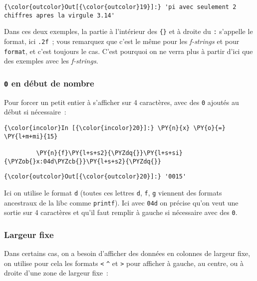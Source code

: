 \begin{Verbatim}[commandchars=\\\{\}]
{\color{outcolor}Out[{\color{outcolor}19}]:} 'pi avec seulement 2 chiffres apres la virgule 3.14'
\end{Verbatim}
            
    Dans ces deux exemples, la partie à l'intérieur des \texttt{\{\}} et à
droite du \texttt{:} s'appelle le format, ici \texttt{.2f}~; vous
remarquez que c'est le même pour les \emph{f-strings} et pour
\texttt{format}, et c'est toujours le cas. C'est pourquoi on ne verra
plus à partir d'ici que des exemples avec les \emph{f-strings}.

    \hypertarget{en-duxe9but-de-nombre}{%
\subsubsection{\texorpdfstring{\texttt{0} en début de
nombre}{0 en début de nombre}}\label{en-duxe9but-de-nombre}}

    Pour forcer un petit entier à s'afficher sur 4 caractères, avec des
\texttt{0} ajoutés au début si nécessaire~:

    \begin{Verbatim}[commandchars=\\\{\}]
{\color{incolor}In [{\color{incolor}20}]:} \PY{n}{x} \PY{o}{=} \PY{l+m+mi}{15}
         
         \PY{n}{f}\PY{l+s+s2}{\PYZdq{}}\PY{l+s+si}{\PYZob{}x:04d\PYZcb{}}\PY{l+s+s2}{\PYZdq{}}
\end{Verbatim}


\begin{Verbatim}[commandchars=\\\{\}]
{\color{outcolor}Out[{\color{outcolor}20}]:} '0015'
\end{Verbatim}
            
    Ici on utilise le format \texttt{d} (toutes ces lettres \texttt{d},
\texttt{f}, \texttt{g} viennent des formats ancestraux de la libc comme
\texttt{printf}). Ici avec \texttt{04d} on précise qu'on veut une sortie
sur 4 caractères et qu'il faut remplir à gauche si nécessaire avec des
\texttt{0}.

    \hypertarget{largeur-fixe}{%
\subsubsection{Largeur fixe}\label{largeur-fixe}}

    Dans certains cas, on a besoin d'afficher des données en colonnes de
largeur fixe, on utilise pour cela les formats \texttt{\textless{}}
\texttt{\^{}} et \texttt{\textgreater{}} pour afficher à gauche, au
centre, ou à droite d'une zone de largeur fixe~:

